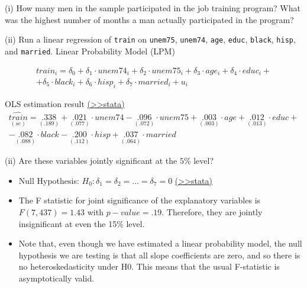 \documentclass[
  10pt,
  ignorenonframetext,
]{beamer}
\begin{document}
\begin{frame}{(i) How many men in the sample participated in the job
training program? What was the highest number of months a man actually
participated in the program?}
\protect\hypertarget{i-how-many-men-in-the-sample-participated-in-the-job-training-program-what-was-the-highest-number-of-months-a-man-actually-participated-in-the-program}{}
\end{frame}

\begin{frame}{(ii) Run a linear regression of \texttt{train} on
\texttt{unem75}, \texttt{unem74}, \texttt{age}, \texttt{educ},
\texttt{black}, \texttt{hisp}, and \texttt{married}.}
\protect\hypertarget{ii-run-a-linear-regression-of-train-on-unem75-unem74-age-educ-black-hisp-and-married.}{}
Linear Probability Model (LPM)

\[
\begin{aligned}
train_i = \delta_0 + \delta_1 \cdot unem74_i + \delta_2 \cdot unem75_i + \delta_3 \cdot age_i + \delta_4 \cdot educ_i +\\
+ \delta_5 \cdot black_i + \delta_6 \cdot hisp_i + \delta_7 \cdot married_i + u_i
\end{aligned}
\]

OLS estimation result
\footnotesize \protect\hyperlink{LMPtrain_norobust}{(\textgreater\textgreater stata)}
\small \[
\begin{aligned}
\underset{(se)}{\widehat{train}} = \underset{(.189)}{.338} + \underset{(.077)}{.021} \cdot unem74 - \underset{(.072)}{.096} \cdot unem75 + \underset{(.003)}{.003} \cdot age + \underset{(.013)}{.012} \cdot educ +\\- \underset{(.088)}{.082} \cdot black - \underset{(.112)}{.200} \cdot hisp + \underset{(.064)}{.037} \cdot married
\end{aligned}
\]
\end{frame}

\begin{frame}{(ii) Are these variables jointly significant at the
\(5\%\) level?}
\protect\hypertarget{ii-are-these-variables-jointly-significant-at-the-5-level}{}
\begin{itemize}
\item
  Null Hypothesis: \(H_0: \delta_1 = \delta_2 = \ldots = \delta_7 = 0\)
  \footnotesize \protect\hyperlink{LMPtrain_norobust}{(\textgreater\textgreater stata)}
  \normalsize
\item
  The F statistic for joint significance of the explanatory variables is
  \(F(7,437) = 1.43\) with \(p-value = .19\). Therefore, they are
  jointly insignificant at even the 15\% level.
\item
  Note that, even though we have estimated a linear probability model,
  the null hypothesis we are testing is that all slope coefficients are
  zero, and so there is no heteroskedasticity under H0. This means that
  the usual F-statistic is asymptotically valid.
\end{itemize}
\end{frame}
\end{document}
